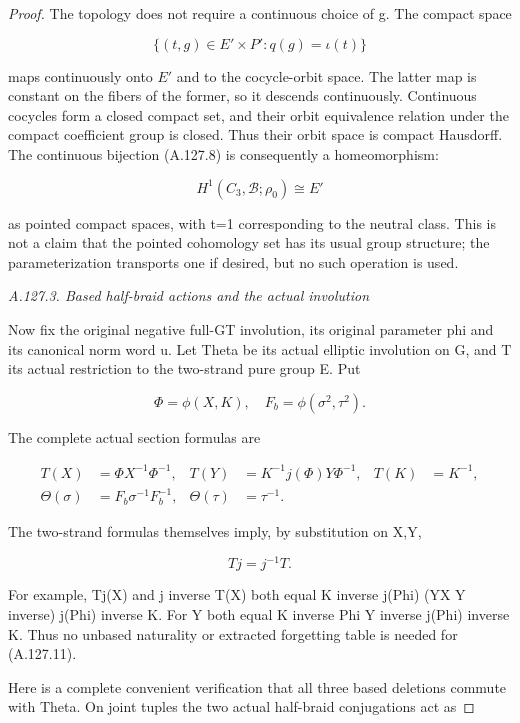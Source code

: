 \begin{proof}
The topology does not require a continuous choice of g. The compact space

\[
 \{(t,g)\in E'\times P':q(g)=\iota(t)\}
\]

maps continuously onto \(E'\) and to the cocycle-orbit space. The latter map is constant on the fibers of the former, so it descends continuously. Continuous cocycles form a closed compact set, and their orbit equivalence relation under the compact coefficient group is closed. Thus their orbit space is compact Hausdorff. The continuous bijection (A.127.8) is consequently a homeomorphism:

\[
 \boxed{H^1(C_3,\mathcal B;\rho_0)\cong E'}
\tag{A.127.9}
\]

as pointed compact spaces, with t=1 corresponding to the neutral class. This is not a claim that the pointed cohomology set has its usual group structure; the parameterization transports one if desired, but no such operation is used.

\par\smallskip\noindent\emph{A.127.3. Based half-braid actions and the actual involution}

Now fix the original negative full-GT involution, its original parameter phi and its canonical norm word u. Let Theta be its actual elliptic involution on G, and T its actual restriction to the two-strand pure group E. Put

\[
 \Phi=\phi(X,K),\quad F_b=\phi(\sigma^2,\tau^2).
\]

The complete actual section formulas are

\[
 \begin{aligned}
 T(X)&=\Phi X^{-1}\Phi^{-1},&
 T(Y)&=K^{-1}j(\Phi)Y\Phi^{-1},& T(K)&=K^{-1},\\
 \Theta(\sigma)&=F_b\sigma^{-1}F_b^{-1},&
 \Theta(\tau)&=\tau^{-1}.&&
 \end{aligned}
\tag{A.127.10}
\]

The two-strand formulas themselves imply, by substitution on X,Y,

\[
 Tj=j^{-1}T.
\tag{A.127.11}
\]

For example, Tj(X) and j inverse T(X) both equal
K inverse j(Phi) (YX Y inverse) j(Phi) inverse K. For Y both equal
K inverse Phi Y inverse j(Phi) inverse K. Thus no unbased naturality or extracted forgetting table is needed for (A.127.11).

Here is a complete convenient verification that all three based deletions commute with Theta. On joint tuples the two actual half-braid conjugations act as


\end{proof}
